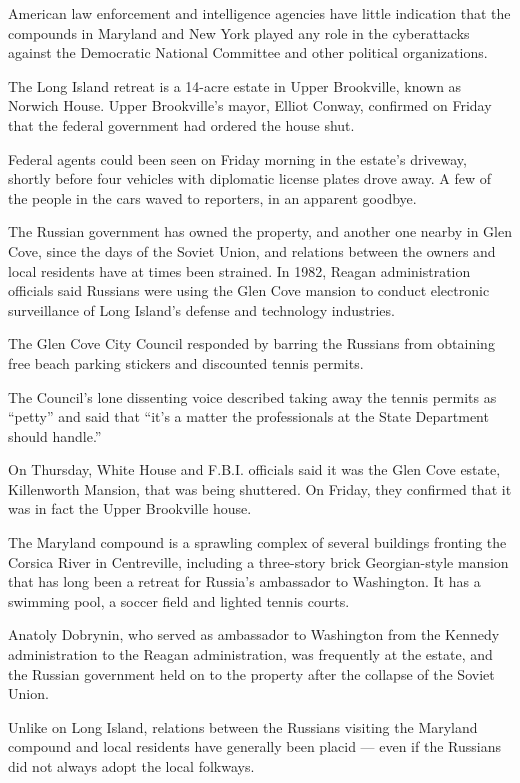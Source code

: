 American law enforcement and intelligence agencies have little
indication that the compounds in Maryland and New York played any role
in the cyberattacks against the Democratic National Committee and other
political organizations.

The Long Island retreat is a 14-acre estate in Upper Brookville, known
as Norwich House. Upper Brookville's mayor, Elliot Conway, confirmed on
Friday that the federal government had ordered the house shut.

Federal agents could been seen on Friday morning in the estate's
driveway, shortly before four vehicles with diplomatic license plates
drove away. A few of the people in the cars waved to reporters, in an
apparent goodbye.

The Russian government has owned the property, and another one nearby in
Glen Cove, since the days of the Soviet Union, and relations between the
owners and local residents have at times been strained. In 1982, Reagan
administration officials said Russians were using the Glen Cove mansion
to conduct electronic surveillance of Long Island's defense and
technology industries.

The Glen Cove City Council responded by barring the Russians from
obtaining free beach parking stickers and discounted tennis permits.

The Council's lone dissenting voice described taking away the tennis
permits as ``petty'' and said that ``it's a matter the professionals at
the State Department should handle.''

On Thursday, White House and F.B.I. officials said it was the Glen Cove
estate, Killenworth Mansion, that was being shuttered. On Friday, they
confirmed that it was in fact the Upper Brookville house.

The Maryland compound is a sprawling complex of several buildings
fronting the Corsica River in Centreville, including a three-story brick
Georgian-style mansion that has long been a retreat for Russia's
ambassador to Washington. It has a swimming pool, a soccer field and
lighted tennis courts.

Anatoly Dobrynin, who served as ambassador to Washington from the
Kennedy administration to the Reagan administration, was frequently at
the estate, and the Russian government held on to the property after the
collapse of the Soviet Union.

Unlike on Long Island, relations between the Russians visiting the
Maryland compound and local residents have generally been placid ---
even if the Russians did not always adopt the local folkways.

